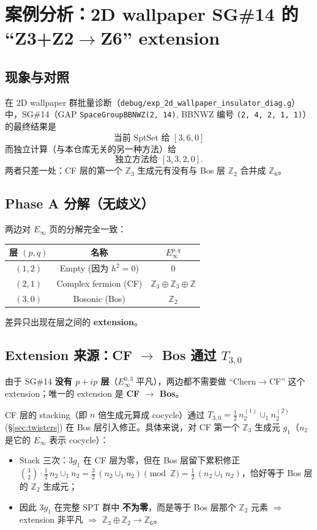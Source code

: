 \documentclass[a4paper,fontset=ubuntu,12pt]{ctexart}
\newcommand{\ZZ}{\mathbb{Z}}
\begin{document}
\section{案例分析：2D wallpaper SG\#14 的 ``Z3+Z2$\to$Z6'' extension}
\label{sec:sg14-case}

\subsection{现象与对照}

在 2D wallpaper 群批量诊断（\texttt{debug/exp\_2d\_wallpaper\_insulator\_diag.g}）中，SG\#14（GAP \texttt{SpaceGroupBBNWZ(2, 14)}, BBNWZ 编号 \texttt{(2, 4, 2, 1, 1)}）的最终结果是
\[
\boxed{\text{当前 SptSet 给 } [3, 6, 0]}
\]
而独立计算（与本仓库无关的另一种方法）给
\[
\text{独立方法给 } [3, 3, 2, 0].
\]
两者只差一处：CF 层的第一个 $\ZZ_3$ 生成元有没有与 Bos 层 $\ZZ_2$ 合并成 $\ZZ_6$。

\subsection{Phase A 分解（无歧义）}

两边对 $E_\infty$ 页的分解完全一致：
\begin{center}
\begin{tabular}{c|c|c}
\hline
层 $(p, q)$ & 名称 & $E_\infty^{p, q}$ \\
\hline
$(1, 2)$ & Empty (因为 $h^2 = 0$) & $0$ \\
$(2, 1)$ & Complex fermion (CF) & $\ZZ_3 \oplus \ZZ_3 \oplus \ZZ$ \\
$(3, 0)$ & Bosonic (Bos) & $\ZZ_2$ \\
\hline
\end{tabular}
\end{center}

差异只出现在层之间的 \textbf{extension}。

\subsection{Extension 来源：CF $\to$ Bos 通过 $T_{3,0}$}

由于 SG\#14 \textbf{没有 $p+ip$ 层}（$E_\infty^{0, 3}$ 平凡），两边都不需要做 ``Chern$\to$CF'' 这个 extension；唯一的 extension 是 \textbf{CF $\to$ Bos}。

CF 层的 stacking（即 $n$ 倍生成元算成 cocycle）通过 $T_{3,0} = \frac{1}{2}\, n_2^{(1)} \cup_1 n_2^{(2)}$ (\S\ref{sec:twisters}) 在 Bos 层引入修正。具体来说，对 CF 第一个 $\ZZ_3$ 生成元 $g_1$（$n_2$ 是它的 $E_\infty$ 表示 cocycle）：
\begin{itemize}
\item Stack 三次：$3 g_1$ 在 CF 层为零，但在 Bos 层留下累积修正 $\binom{3}{2} \cdot \frac{1}{2}\, n_2 \cup_1 n_2 = \frac{3}{2}\, (n_2 \cup_1 n_2) \pmod{\mathbb{Z}} = \frac{1}{2}\, (n_2 \cup_1 n_2)$，恰好等于 Bos 层的 $\ZZ_2$ 生成元；
\item 因此 $3 g_1$ 在完整 SPT 群中 \textbf{不为零}，而是等于 Bos 层那个 $\ZZ_2$ 元素 $\Rightarrow$ extension 非平凡 $\Rightarrow$ $\ZZ_3 \oplus \ZZ_2 \to \ZZ_6$。
\end{itemize}
\end{document}
